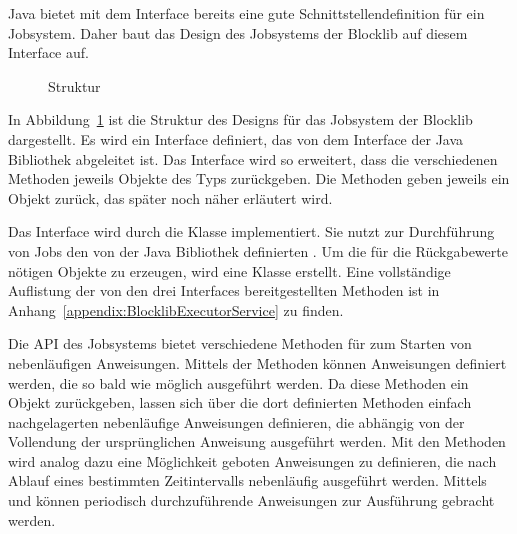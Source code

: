 Java bietet mit dem Interface  bereits eine gute Schnittstellendefinition für ein Jobsystem. Daher baut das Design des Jobsystems der Blocklib auf diesem Interface auf. 

\begin{figure}
	
	\caption{Struktur }\label{fig:GrobesDesign}
\end{figure}

In Abbildung~\ref{fig:GrobesDesign} ist die Struktur des Designs für das Jobsystem der Blocklib dargestellt. Es wird ein Interface  definiert, das von dem Interface  der Java Bibliothek abgeleitet ist. Das Interface wird so erweitert, dass die verschiedenen  Methoden jeweils Objekte des Typs  zurückgeben. Die  Methoden geben jeweils ein  Objekt zurück, das später noch näher erläutert wird.

Das Interface  wird durch die Klasse  implementiert. Sie nutzt zur Durchführung von Jobs den von der Java Bibliothek definierten . Um die für die Rückgabewerte nötigen  Objekte zu erzeugen, wird eine Klasse  erstellt. Eine vollständige Auflistung der von den drei Interfaces bereitgestellten Methoden ist in Anhang~\ref{appendix:BlocklibExecutorService} zu finden. 

Die API des Jobsystems bietet verschiedene Methoden für zum Starten von nebenläufigen Anweisungen. Mittels der  Methoden können Anweisungen definiert werden, die so bald wie möglich ausgeführt werden. Da diese Methoden ein  Objekt zurückgeben, lassen sich über die dort definierten Methoden einfach nachgelagerten nebenläufige Anweisungen definieren, die abhängig von der Vollendung der ursprünglichen Anweisung ausgeführt werden. Mit den  Methoden wird analog dazu eine Möglichkeit geboten Anweisungen zu definieren, die nach Ablauf eines bestimmten Zeitintervalls nebenläufig ausgeführt werden. Mittels  und  können periodisch durchzuführende Anweisungen zur Ausführung gebracht werden.